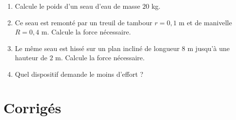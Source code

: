 \begin{enumerate}[label=\arabic*)]
\item Calcule le poids d'un seau d'eau de masse $20$ kg.
\item Ce seau est remonté par un treuil de tambour $r=0{,}1$ m et de manivelle $R=0{,}4$
m. Calcule la force nécessaire.
\item Le même seau est hissé sur un plan incliné de longueur $8$ m jusqu'à une hauteur de
$2$ m. Calcule la force nécessaire.
\item Quel dispositif demande le moins d'effort ?
\end{enumerate}

\section{Corrigés}
